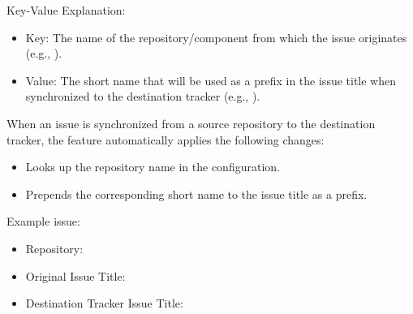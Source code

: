 Key-Value Explanation:
\begin{itemize}
   \item Key: The name of the repository/component from which the issue
         originates (e.g., ).
   \item Value: The short name that will be used as a prefix in the issue title
         when synchronized to the destination tracker (e.g., ).
\end{itemize}

When an issue is synchronized from a source repository to the destination
tracker, the feature automatically applies the following changes:
\begin{itemize}
   \item Looks up the repository name in the  configuration.
   \item Prepends the corresponding short name to the issue title as a prefix.
\end{itemize}

Example issue:
\begin{itemize}
   \item Repository: 
   \item Original Issue Title: 
   \item Destination Tracker Issue Title: 
\end{itemize}
